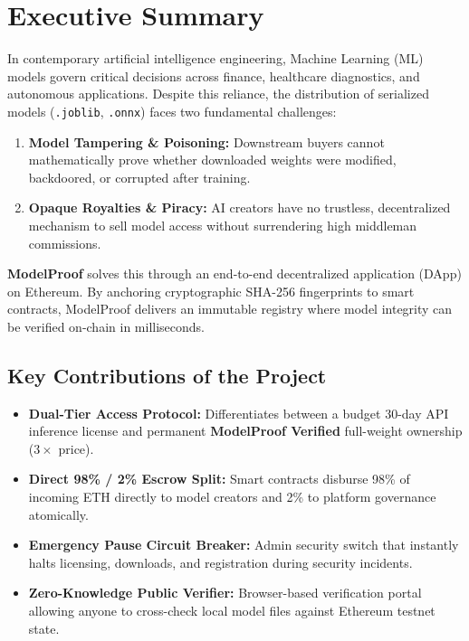\documentclass[11pt,a4paper]{article}
\begin{document}
\section*{Executive Summary}
In contemporary artificial intelligence engineering, Machine Learning (ML) models govern critical decisions across finance, healthcare diagnostics, and autonomous applications. Despite this reliance, the distribution of serialized models (\texttt{.joblib}, \texttt{.onnx}) faces two fundamental challenges:
\begin{enumerate}[leftmargin=1.5em]
    \item \textbf{Model Tampering \& Poisoning:} Downstream buyers cannot mathematically prove whether downloaded weights were modified, backdoored, or corrupted after training.
    \item \textbf{Opaque Royalties \& Piracy:} AI creators have no trustless, decentralized mechanism to sell model access without surrendering high middleman commissions.
\end{enumerate}

\textbf{ModelProof} solves this through an end-to-end decentralized application (DApp) on Ethereum. By anchoring cryptographic SHA-256 fingerprints to smart contracts, ModelProof delivers an immutable registry where model integrity can be verified on-chain in milliseconds.

\subsection*{Key Contributions of the Project}
\begin{itemize}[leftmargin=1.5em]
    \item \textbf{Dual-Tier Access Protocol:} Differentiates between a budget 30-day API inference license and permanent \textbf{ModelProof Verified\texttrademark} full-weight ownership ($3\times$ price).
    \item \textbf{Direct 98\% / 2\% Escrow Split:} Smart contracts disburse 98\% of incoming ETH directly to model creators and 2\% to platform governance atomically.
    \item \textbf{Emergency Pause Circuit Breaker:} Admin security switch that instantly halts licensing, downloads, and registration during security incidents.
    \item \textbf{Zero-Knowledge Public Verifier:} Browser-based verification portal allowing anyone to cross-check local model files against Ethereum testnet state.
\end{itemize}
\end{document}
